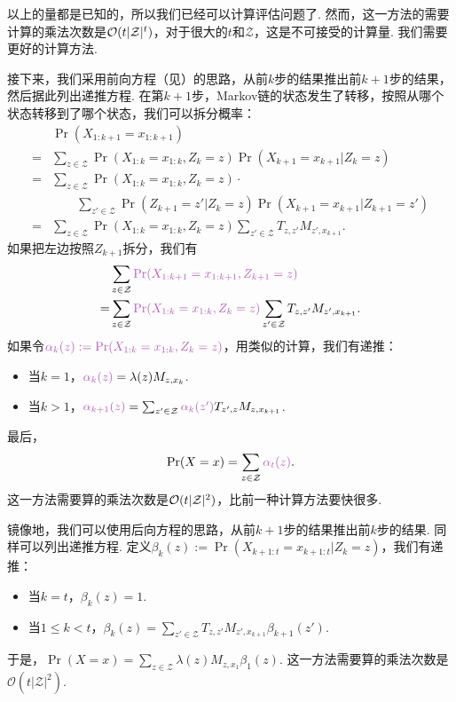 以上的量都是已知的，所以我们已经可以计算评估问题了. 然而，这一方法的需要计算的乘法次数是$\mathcal{O}(t|\mathcal Z|^t)$，对于很大的$t$和$\mathcal Z$，这是不可接受的计算量. 我们需要更好的计算方法.

接下来，我们采用前向方程（见）的思路，从前$k$步的结果推出前$k+1$步的结果，然后据此列出递推方程. 在第$k+1$步，Markov链的状态发生了转移，按照从哪个状态转移到了哪个状态，我们可以拆分概率：
\begin{align*}
      &\Pr(X_{1:k+1}=x_{1:k+1}) \\
    = &\sum_{z\in \mathcal Z}\Pr(X_{1:k}=x_{1:k}, Z_k=z)\Pr(X_{k+1}=x_{k+1}|Z_k=z)\\
    = &\sum_{z\in \mathcal Z}\Pr(X_{1:k}=x_{1:k}, Z_k=z)\cdot\\
    &\qquad\sum_{z'\in \mathcal Z}\Pr(Z_{k+1}=z'|Z_k=z)\Pr(X_{k+1}=x_{k+1}|Z_{k+1}=z')\\
    = &\sum_{z\in \mathcal Z}\Pr(X_{1:k}=x_{1:k}, Z_k=z)\sum_{z'\in \mathcal Z}T_{z,z'}M_{z',x_{k+1}}.
\end{align*}
如果把左边按照$Z_{k+1}$拆分，我们有
\begin{align*}
    &\sum_{z\in\mathcal Z}\light{\Pr(X_{1:k+1}=x_{1:k+1}, Z_{k+1}=z)}\\
    =& \sum_{z\in \mathcal Z}\light{\Pr(X_{1:k}=x_{1:k}, Z_k=z)}\sum_{z'\in \mathcal Z}T_{z,z'}M_{z',x_{k+1}}.
\end{align*}
如果令$\light{\alpha_k(z):=\Pr(X_{1:k}=x_{1:k}, Z_k=z)}$，用类似的计算，我们有递推：
\begin{itemize}
    \item 当$k=1$，$\light{\alpha_k(z)} = \lambda(z)M_{z,x_k}$.
    \item 当$k>1$，$\light{\alpha_{k+1}(z)} = \sum_{z' \in \mathcal Z}\light{\alpha_{k}(z')}T_{z',z}M_{z,x_{k+1}}$.
\end{itemize}
最后，
\[\Pr(X=x) = \sum_{z\in \mathcal Z}\light{\alpha_t(z)}.\]
这一方法需要算的乘法次数是$\mathcal{O}(t|\mathcal Z|^2)$，比前一种计算方法要快很多.

镜像地，我们可以使用后向方程的思路，从前$k+1$步的结果推出前$k$步的结果. 同样可以列出递推方程. 定义$\beta_k(z):=\Pr(X_{k+1:t}=x_{k+1:t} | Z_k=z)$，我们有递推：
\begin{itemize}
    \item 当$k = t$，$\beta_k(z) = 1$.
    \item 当$1 \leq k < t$，$\beta_{k}(z) = \sum_{z' \in \mathcal Z}T_{z,z'}M_{z',x_{k+1}}\beta_{k+1}(z')$.
\end{itemize}
于是，$\Pr(X=x) = \sum_{z\in \mathcal Z}\lambda(z)M_{z,x_1}\beta_1(z)$. 这一方法需要算的乘法次数是$\mathcal O(t|\mathcal Z|^2)$.


